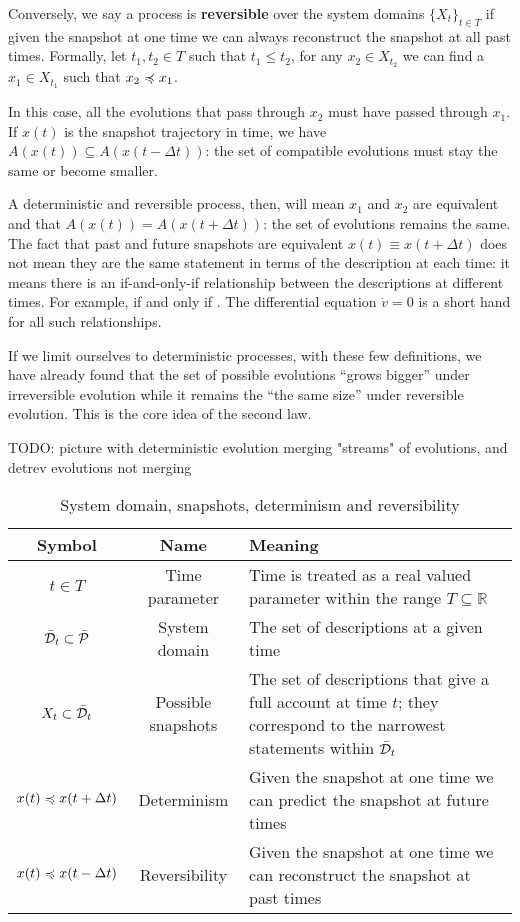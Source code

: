 \documentclass[letterpaper]{article}
\begin{document}
Conversely, we say a process is \textbf{reversible} over the system domains $\{X_t\}_{t \in T}$ if given the snapshot at one time we can always reconstruct the snapshot at all past times. Formally, let $t_1, t_2 \in T$ such that $t_1 \leq t_2$, for any $x_2 \in X_{t_2}$ we can find a $x_1 \in X_{t_1}$ such that $x_2 \narrower x_1$.

In this case, all the evolutions that pass through $x_2$ must have passed through $x_1$. If $x(t)$ is the snapshot trajectory in time, we have $A(x(t)) \subseteq A(x(t - \Delta t))$: the set of compatible evolutions must stay the same or become smaller.

A deterministic and reversible process, then, will mean $x_1$ and $x_2$ are equivalent and that  $A(x(t)) = A(x(t + \Delta t))$: the set of evolutions remains the same. The fact that past and future snapshots are equivalent $x(t) \equiv x(t + \Delta t)$ does not mean they are the same statement in terms of the description at each time: it means there is an if-and-only-if relationship between the descriptions at different times. For example,  if and only if . The differential equation $\dot{v} = 0$ is a short hand for all such relationships.

If we limit ourselves to deterministic processes, with these few definitions, we have already found that the set of possible evolutions ``grows bigger'' under irreversible evolution while it remains the ``the same size'' under reversible evolution. This is the core idea of the second law.


TODO: picture with deterministic evolution merging "streams" of evolutions, and detrev evolutions not merging

\begin{table}[h!]
	\centering
	\begin{tabular}[h]{|c|c|p{6cm}|}
		\hline 
		Symbol & Name & Meaning \\ 
		\hline 
		$t \in T$ & Time parameter & Time is treated as a real valued parameter within the range $T \subseteq \mathbb{R}$ \\ 
		\hline 
		$\tdomain_t \subset \tdomain[P]$ & System domain & The set of descriptions at a given time \\ 
		\hline 
		$X_t \subset \tdomain_t$ & Possible snapshots & The set of descriptions that give a full account at time $t$; they correspond to the narrowest statements within $\tdomain_t$ \\ 
		\hline 
		$x(t) \narrower x(t + \Delta t)$ & Determinism & Given the snapshot at one time we can predict the snapshot at future times \\ 
		\hline 
		$x(t) \narrower x(t - \Delta t)$ & Reversibility & Given the snapshot at one time we can reconstruct the snapshot at past times \\ 
		\hline 
	\end{tabular} 
	\caption{System domain, snapshots, determinism and reversibility}
	\label{table:states}
\end{table}
\end{document}

